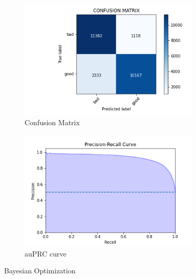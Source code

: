 \documentclass[conference]{IEEEtran}
\begin{document}
\begin{figure}[h!]
\begin{subfigure}{0.5\textwidth}
\centering
\includegraphics[width=0.95\textwidth]{hyperas/hyperas-confusion-matrix.png}
\caption{Confusion Matrix}
\end{subfigure}%
\begin{subfigure}{0.5\textwidth}
\centering
\includegraphics[width=0.95\textwidth]{hyperas/Precision-Recall-Curve-hyperas.png}
\caption{auPRC curve}
\end{subfigure}%
\caption{Bayesian Optimization}
\end{figure}
\end{document}
